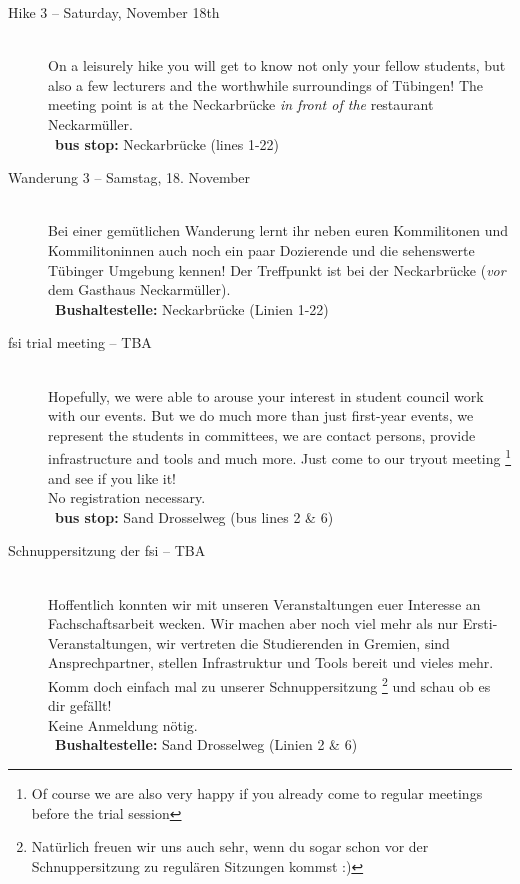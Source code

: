 \begin{description}
\ifml
	\item[Hike 3 -- Saturday, November 18th \YEAR]~\\%
	On a leisurely hike you will get to know not only your fellow students,
	but also a few lecturers and the worthwhile surroundings of Tübingen!
	The meeting point is at the Neckarbrücke \emph{in front of the} restaurant \glqq Neckarmüller\grqq. \\
	~\textbf{bus stop:} Neckarbrücke (lines 1-22)
\else
	\item[Wanderung 3 -- Samstag, 18. November \YEAR]~\\%
	Bei einer gemütlichen Wanderung lernt ihr neben euren Kommilitonen und Kommilitoninnen auch
	noch ein paar Dozierende und die sehenswerte Tübinger Umgebung kennen!
	Der Treffpunkt ist bei der Neckarbrücke (\emph{vor} dem Gasthaus \glqq Neckarmüller\grqq).\\
	~\textbf{Bushaltestelle:} Neckarbrücke (Linien 1-22)
\fi

\ifml
	\item[fsi trial meeting -- TBA]~\\%
	Hopefully, we were able to arouse your interest in student council work with our events.
	But we do much more than just first-year events, we represent the students in committees,
	we are contact persons, provide infrastructure and tools and much more.
	Just come to our tryout meeting
	\footnote{Of course we are also very happy if you already come to regular meetings before the trial session}
	and see if you like it!\\
	No registration necessary.\\
	~\textbf{bus stop:} Sand Drosselweg (bus lines 2 \& 6)
\else
	\item[Schnuppersitzung der fsi -- TBA]~\\%
	Hoffentlich konnten wir mit unseren Veranstaltungen euer Interesse an Fachschaftsarbeit wecken.
	Wir machen aber noch viel mehr als nur Ersti-Veranstaltungen, wir vertreten die Studierenden in Gremien,
	sind Ansprechpartner, stellen Infrastruktur und Tools bereit und vieles mehr.
	Komm doch einfach mal zu unserer Schnuppersitzung
	\footnote{Natürlich freuen wir uns auch sehr, wenn du sogar schon vor der Schnuppersitzung zu regulären Sitzungen kommst :)}
	und schau ob es dir gefällt!\\
	Keine Anmeldung nötig.\\
	~\textbf{Bushaltestelle:} Sand Drosselweg (Linien 2 \& 6)
\fi


\end{description}
